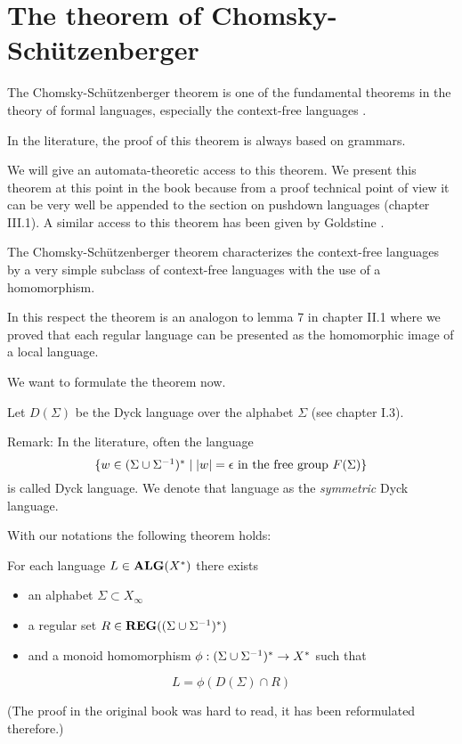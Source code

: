 \section{The theorem of Chomsky-Schützenberger}

The Chomsky-Schützenberger theorem is one of the fundamental theorems in the
theory of formal languages, especially the context-free languages \cite{ChSch}.

In the literature, the proof of this theorem is always based on grammars.

We will give an automata-theoretic access to this theorem. We present this
theorem at this point in the book because from a proof technical point of
view it can be very well be appended to the section on pushdown languages
(chapter III.1). A similar access to this theorem has been given by Goldstine
 \cite{Goldstine77,Goldstine79,Goldstine80}.

The Chomsky-Schützenberger theorem characterizes the context-free languages
by a very simple subclass of context-free languages with the use of a
homomorphism.

In this respect the theorem is an analogon to lemma 7 in chapter II.1 where we
proved that each regular language can be presented as the homomorphic image of
a local language.

We want to formulate the theorem now.

Let $D(\Sigma)$ be the Dyck language over the alphabet $\Sigma$ (see chapter
I.3).

Remark: In the literature, often the language \[ \mbox{$\{w\in
(\Sigma \cup {\Sigma}^{-1})^* \mid |w|= \epsilon\text{ in the free group }F(\Sigma)\}$} \]
is called Dyck language. We denote that language as the {\em symmetric} Dyck
language.

With our notations the following theorem holds:
\begin{theorem} For each language $L\in \mbox{{\bf ALG}}(X^*)$
there exists
\begin{itemize}
  \item an alphabet $\Sigma \subset X_\infty$
  \item a regular set $R\in \mbox{{\bf REG}}((\Sigma \cup {\Sigma}^{-1})^*)$
  \item and a monoid homomorphism $\phi: (\Sigma \cup {\Sigma}^{-1})^* \to X^*$ such
  that
\end{itemize}
\[ L = \phi(D(\Sigma)\cap R) \]
\end{theorem}

(The proof in the original book was hard to read, it has been reformulated
therefore.)

